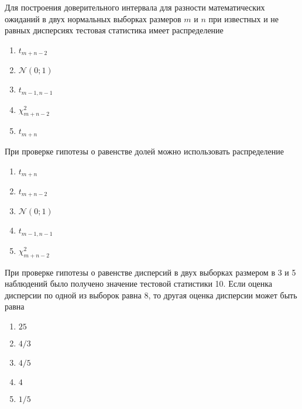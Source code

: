 \documentclass[t]{beamer}
\newcommand{\cN}{\mathcal{N}}
\begin{document}
 \begin{frame} \label{5} 
\begin{block}{5} 

  Для построения доверительного интервала для разности математических ожиданий в двух нормальных выборках размеров $m$ и $n$ при известных и не равных дисперсиях тестовая статистика имеет распределение


 \end{block} 
\begin{enumerate} 
\item[] \hyperlink{5-No}{\beamergotobutton{} $t_{m+n-2}$}
\item[] \hyperlink{5-Yes}{\beamergotobutton{} $\cN(0;1)$}
\item[] \hyperlink{5-No}{\beamergotobutton{} $t_{m-1,n-1}$}
\item[] \hyperlink{5-No}{\beamergotobutton{} $\chi^2_{m+n-2}$}
\item[] \hyperlink{5-No}{\beamergotobutton{} $t_{m+n}$}
\end{enumerate} 
\end{frame} 


 \begin{frame} \label{6} 
\begin{block}{6} 

  При проверке гипотезы о равенстве долей можно использовать распределение


 \end{block} 
\begin{enumerate} 
\item[] \hyperlink{6-No}{\beamergotobutton{} $t_{m+n}$}
\item[] \hyperlink{6-No}{\beamergotobutton{} $t_{m+n-2}$}
\item[] \hyperlink{6-Yes}{\beamergotobutton{} $\cN(0;1)$}
\item[] \hyperlink{6-No}{\beamergotobutton{} $t_{m-1,n-1}$}
\item[] \hyperlink{6-No}{\beamergotobutton{} $\chi^2_{m+n-2}$}
\end{enumerate} 
\end{frame} 


 \begin{frame} \label{7} 
\begin{block}{7} 

   При проверке гипотезы о равенстве дисперсий в двух выборках размером в 3 и 5 наблюдений было получено значение тестовой статистики 10. Если оценка дисперсии по одной из выборок равна 8, то другая оценка дисперсии может быть равна


 \end{block} 
\begin{enumerate} 
\item[] \hyperlink{7-No}{\beamergotobutton{} $25$}
\item[] \hyperlink{7-No}{\beamergotobutton{} $4/3$}
\item[] \hyperlink{7-Yes}{\beamergotobutton{} $4/5$}
\item[] \hyperlink{7-No}{\beamergotobutton{} $4$}
\item[] \hyperlink{7-No}{\beamergotobutton{} $1/5$}
\end{enumerate} 
\end{frame} 
\end{document}

